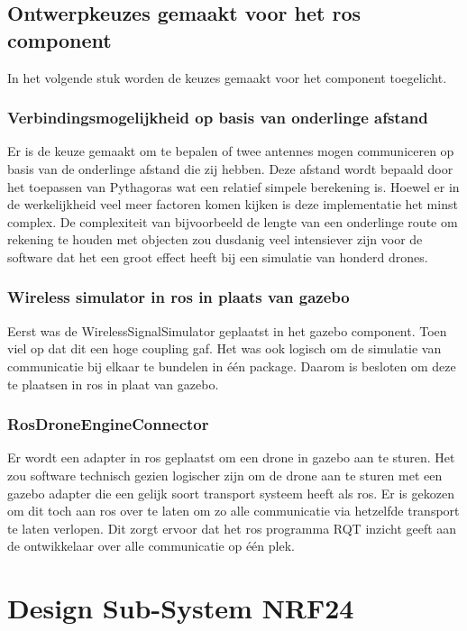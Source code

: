\documentclass[a4paper, 11pt, oneside]{report}
\begin{document}
\subsection{Ontwerpkeuzes gemaakt voor het ros component}
\label{DetailedDesign:ros:ontwerkeuzes}
In het volgende stuk worden de keuzes gemaakt voor het component toegelicht.

\subsubsection{Verbindingsmogelijkheid op basis van onderlinge afstand}
Er is de keuze gemaakt om te bepalen of twee antennes mogen communiceren op basis van de onderlinge afstand die zij hebben.
Deze afstand wordt bepaald door het toepassen van Pythagoras wat een relatief simpele berekening is. 
Hoewel er in de werkelijkheid veel meer factoren komen kijken is deze implementatie het minst complex.
De complexiteit van bijvoorbeeld de lengte van een onderlinge route om rekening te houden met objecten zou dusdanig veel intensiever zijn voor de software dat het een groot effect heeft bij een simulatie van honderd drones.

\subsubsection{Wireless simulator in ros in plaats van gazebo}
Eerst was de WirelessSignalSimulator geplaatst in het gazebo component. 
Toen viel op dat dit een hoge coupling gaf.
Het was ook logisch om de simulatie van communicatie bij elkaar te bundelen in één package.
Daarom is besloten om deze te plaatsen in ros in plaat van gazebo.

\subsubsection{RosDroneEngineConnector}
Er wordt een adapter in ros geplaatst om een drone in gazebo aan te sturen.
Het zou software technisch gezien logischer zijn om de drone aan te sturen met een gazebo adapter die een gelijk soort transport systeem heeft als ros.
Er is gekozen om dit toch aan ros over te laten om zo alle communicatie via hetzelfde transport te laten verlopen.
Dit zorgt ervoor dat het ros programma RQT inzicht geeft aan de ontwikkelaar over alle communicatie op één plek.


\section{Design Sub-System NRF24}
\label{DetailedDesign:NRF24}
\end{document}

